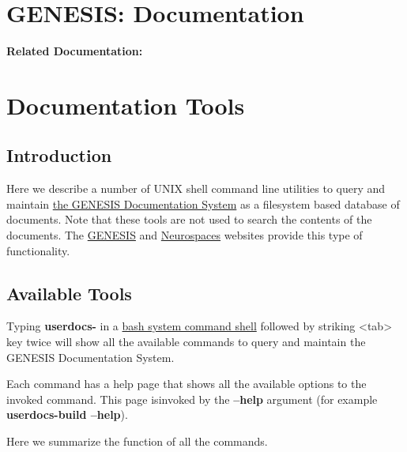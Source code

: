 \documentclass[12pt]{article}
\begin{document}
\section*{GENESIS: Documentation}

{\bf Related Documentation:}

\section*{Documentation Tools}

\subsection*{Introduction}

Here we describe a number of UNIX shell command line utilities to
query and maintain
\href{../documentation-overview/documentation-overview.tex}{the
  GENESIS Documentation System} as a filesystem based database of
documents.  Note that these tools are not used to search the contents
of the documents.  The \href{http://www.genesis-sim.org/}{GENESIS} and
\href{http://www.neurospaces.org/}{Neurospaces} websites provide this
type of functionality.


\subsection*{Available Tools}

Typing {\bf userdocs-} in a
\href{http://www.gnu.org/software/bash/}{bash system command shell}
followed by striking <tab> key twice will show all the available
commands to query and maintain the GENESIS Documentation System.

Each command has a help page that shows all the available options to
the invoked command.  This page isinvoked by the {\bf --help} argument
(for example {\bf userdocs-build --help}).

Here we summarize the function of all the commands.
\end{document}
